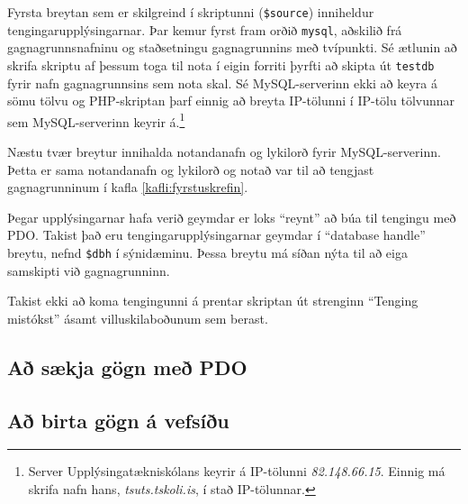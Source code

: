 Fyrsta breytan sem er skilgreind í skriptunni (\verb|$source|) inniheldur tengingarupplýsingarnar. Þar kemur fyrst fram orðið \verb|mysql|, aðskilið frá gagnagrunnsnafninu og staðsetningu gagnagrunnins með tvípunkti. Sé ætlunin að skrifa skriptu af þessum toga til nota í eigin forriti þyrfti að skipta út \verb|testdb| fyrir nafn gagnagrunnsins sem nota skal. Sé MySQL-serverinn ekki að keyra á sömu tölvu og PHP-skriptan þarf einnig að breyta IP-tölunni í IP-tölu tölvunnar sem MySQL-serverinn keyrir á.\footnote{Server Upplýsingatækniskólans keyrir á IP-tölunni \emph{82.148.66.15}. Einnig má skrifa nafn hans, \emph{tsuts.tskoli.is}, í stað IP-tölunnar.}

Næstu tvær breytur innihalda notandanafn og lykilorð fyrir MySQL-serverinn. Þetta er sama notandanafn og lykilorð og notað var til að tengjast gagnagrunninum í kafla \ref{kafli:fyrstuskrefin}.

Þegar upplýsingarnar hafa verið geymdar er loks ``reynt'' að búa til tengingu með PDO. Takist það eru tengingarupplýsingarnar geymdar í  ``database handle'' breytu, nefnd \verb|$dbh| í sýnidæminu. Þessa breytu má síðan nýta til að eiga samskipti við gagnagrunninn.

Takist ekki að koma tengingunni á prentar skriptan út strenginn ``Tenging mistókst'' ásamt villuskilaboðunum sem berast.
\subsection{Að sækja gögn með PDO}
\subsection{Að birta gögn á vefsíðu}